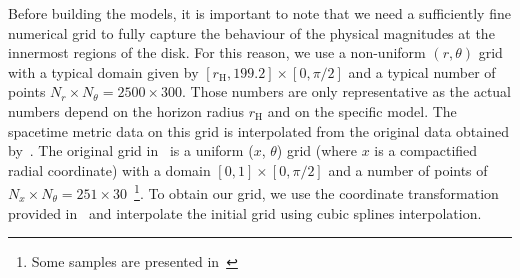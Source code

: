 \documentclass[twocolumn,aps,showpacs,showkeys,prd,superscriptaddress,byrevtex, amsmath]{revtex4-1}
\begin{document}
Before building the models, it is important to note that we need a sufficiently fine numerical grid to fully capture the behaviour of the physical magnitudes at the innermost regions of the disk. For this reason, we use a non-uniform $(r, \theta)$ grid with a typical domain given by $[r_{\mathrm{H}}, 199.2] \times [0, \pi/2]$ and a typical number of points $N_r \times N_{\theta} = 2500 \times 300$. Those numbers are only representative as the actual numbers depend on the horizon radius $r_{\mathrm{H}}$ and on the specific model. The spacetime metric data on this grid is interpolated from the original data obtained by~\cite{Herdeiro:2015b}. The original grid in~\cite{Herdeiro:2015b} is a uniform ($x$, $\theta$) grid (where $x$ is a compactified radial coordinate) with a domain $[0, 1] \times [0, \pi/2]$ and a number of points of $N_x \times N_{\theta} = 251 \times 30$~\footnote{Some samples are presented in~\cite{grav_web}}. To obtain our grid, we use the coordinate transformation provided in~\cite{grav_web} and interpolate the initial grid using cubic splines interpolation. 
\end{document}
